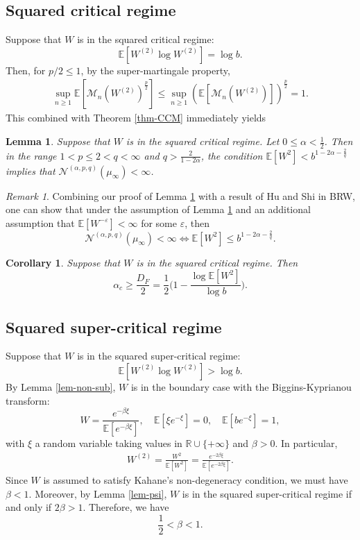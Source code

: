 \documentclass[12pt]{amsart}
\newtheorem{lemma}[theorem]{Lemma}
\newtheorem{corollary}[theorem]{Corollary}
\theoremstyle{definition}
\theoremstyle{remark}
\newtheorem*{remark*}{Remark}
\newcommand{\R}{\mathbb{R}}
\newcommand{\E}{\mathbb{E}}
\newcommand{\MAB}{\mathscr{M}_{n}(W^{(2)})}
\newcommand{\NQ}{\mathcal{N}^{(\alpha, p, q)}}
\numberwithin{equation}{section}
\begin{document}
\subsection{Squared critical regime}
Suppose that $W$ is in  the squared critical regime:
\[
\E[W^{(2)}\log W^{(2)}]=\log b.
\]
Then, for $p/2\le 1$, by the super-martingale property, 
\begin{align*}
\sup_{n\ge 1}\E[\MAB^{\frac{p}{2}}]  \le  \sup_{n\ge 1}(\E[\MAB])^{\frac{p}{2}} = 1. 
\end{align*}
This combined with Theorem \ref{thm-CCM} immediately yields 

\begin{lemma}\label{prop-sq-crit}
Suppose that $W$ is in  the squared critical regime. Let $0\le \alpha<\frac{1}{2}$. Then in the range $1< p\le 2 < q <\infty$ and $q> \frac{2}{1 - 2 \alpha}$, the condition $ \E[W^2] < b^{1- 2\alpha- \frac{2}{q}}$ implies that $\NQ(\mu_\infty)<\infty$.  
\end{lemma}



\begin{remark*}
Combining our proof of Lemma \ref{prop-sq-crit} with  a result of Hu and Shi \cite[Theorem 1.5]{Shi} in BRW,  one  can show that under the assumption of Lemma \ref{prop-sq-crit} and an additional assumption that $\E[W^{-\varepsilon}]<\infty$ for some $\varepsilon$, then 
\[
\NQ(\mu_\infty)<\infty \Longleftrightarrow  \E[W^2]\le b^{1- 2\alpha - \frac{2}{q}}.
\]
\end{remark*}

\begin{corollary}\label{cor-cri}
	Suppose that $W$ is in the  squared critical regime. Then
	\[
	\alpha_{c}\geq \frac{D_F}{2}=\frac{1}{2}\Big(1 - \frac{\log \E[W^2]}{\log b}\Big).
	\]
\end{corollary}




\subsection{Squared super-critical regime}\label{sec-super}

Suppose that $W$ is in the squared super-critical regime:
\[
\E[W^{(2)}\log W^{(2)}]>\log b.
\]
By Lemma \ref{lem-non-sub}, $W$ is in the boundary case with the Biggins-Kyprianou transform: 
\[
W=\frac{e^{-\beta \xi}}{\E[e^{-\beta\xi}]},\quad \E[\xi e^{-\xi}]=0,\quad \E[b e^{-\xi}]=1,
\]
with $\xi$ a random variable taking values in $\R\cup\{+\infty\}$ and  $\beta>0$. 
In particular, 
\begin{align}\label{W2-2beta}
W^{(2)}=\frac{W^2}{\E[W^2]} = \frac{e^{-2\beta \xi}}{\E[e^{-2\beta\xi}]}. 
\end{align}
Since $W$ is assumed to satisfy Kahane's non-degeneracy condition, we must have $\beta<1$. Moreover, by Lemma \ref{lem-psi}, $W$ is in the squared super-critical regime if and only if $2\beta > 1$. Therefore, we have 
\[
\frac{1}{2}< \beta <1. 
\]
\end{document}
